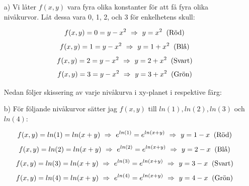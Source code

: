 \documentclass{article}
\begin{document}
\begin{enumerate}
    \item[a)] Vi låter $f(x, y)$ vara fyra olika konstanter för att få fyra olika nivåkurvor. Låt dessa vara 0, 1, 2, och 3 för enkelhetens skull:

        $$
        f(x, y)=0=y-x^2 \ \Rightarrow \  y=x^2 \;\;  \text{(Röd)}
        $$
        $$
        f(x, y)=1=y-x^2 \ \Rightarrow \  y=1+x^2\;\;  \text{(Blå)}
        $$
        $$
        f(x, y)=2=y-x^2 \ \Rightarrow \  y=2+x^2\;\;  \text{(Svart)}
        $$
        $$
        f(x, y)=3=y-x^2 \ \Rightarrow \  y=3+x^2\;\;  \text{(Grön)}
        $$

        \vskip 0.2cm

        Nedan följer skissering av varje nivåkurva i xy-planet i respektive färg: 

        \vskip 0.5cm

        \begin{figure}[h]
            \center
        \end{figure}

    \item[b)] För följande nivåkurvor sätter jag $f(x, y)$ till $ln(1), ln(2), ln(3)$ och $ln(4)$:

        $$
        f(x, y)=ln(1)=ln(x+y) \ \Rightarrow \  e^{ln(1)}=e^{ln(x+y)} \ \Rightarrow \  y=1-x \;\; \text{(Röd)}
        $$
        $$
        f(x, y)=ln(2)=ln(x+y) \ \Rightarrow \  e^{ln(2)}=e^{ln(x+y)} \ \Rightarrow \  y=2-x \;\; \text{(Blå)}
        $$
        $$
        f(x, y)=ln(3)=ln(x+y) \ \Rightarrow \  e^{ln(3)}=e^{ln(x+y)} \ \Rightarrow \  y=3-x \;\; \text{(Svart)}
        $$
        $$
        f(x, y)=ln(4)=ln(x+y) \ \Rightarrow \  e^{ln(4)}=e^{ln(x+y)} \ \Rightarrow \  y=4-x \;\; \text{(Grön)}
        $$


\end{enumerate}
\end{document}
